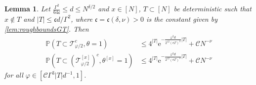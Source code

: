 \documentclass[10pt,a4paper]{amsart}
\newcommand{\ee}{\mathrm{e}}
\newcommand{\abs}[1]{\left| #1 \right|}
\newcommand{\ccc}{\mathfrak{c}}
\newtheorem{lemma}{Lemma}[section]
\numberwithin{equation}{section}
\newcommand*\bset[1]{[#1]}
\begin{document}
	\begin{lemma}\label{lemma:deterministicsetaretypical} 
	 Let $ \frac{\Gamma^2}{64 \mathfrak c} \leq d \leq N^{\delta/2}$ and $x\in [N]$, $ T \subset[N]$ be deterministic  such that $x \notin T$ and $\abs{T} \le \ccc    d/ \Gamma^2 $, where $\ccc= \ccc(\delta,\nu)>0$ is the constant given by \cref{lem:roughboundsGT}. Then  
		\begin{align}
			\mathbb{P} \left( T \subset \mathcal{T}_{\varphi/2}^c,\theta =1 \right) &\le  4^{|T|} \ee^{-\frac{\varphi^2d}{2^{12} (\ee\Gamma)^2}|T|} + \mathcal{C}N^{- \nu} \label{eq:bound_P_T_subset_atypical} \\
			\mathbb{P} \left( T \subset \left(\mathcal{T}^{\bset{x}}_{ \varphi/2}\right)^c,\theta^{\bset{x}} =1 \right) &\le 4^{|T|} \ee^{-\frac{\varphi^2d}{2^{12} (\ee\Gamma)^2}|T|} + \mathcal{C}N^{- \nu}
			\label{eq:bound_P_T_subset_atypical_without_x}
		\end{align}
	for all $ \varphi \in [\mathcal C \Gamma^3 \abs{T} d^{-1},1]$.
	\end{lemma}
\end{document}
